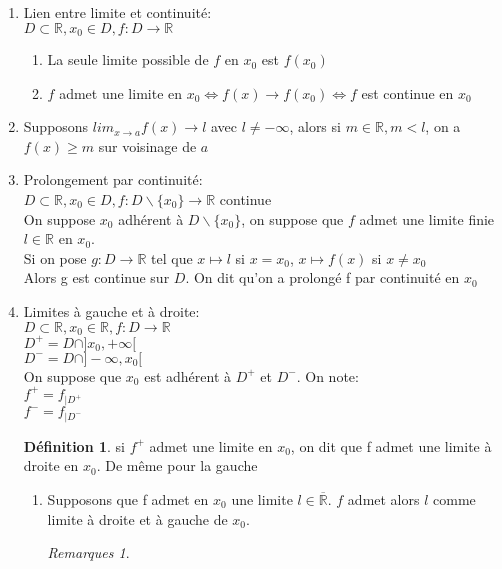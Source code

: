 \documentclass[fleqn]{article}
\theoremstyle{definition} \newtheorem*{defi}{D\'efinition}
\theoremstyle{definition} \newtheorem*{theo}{Th\'eor\`eme}
\theoremstyle{definition} \newtheorem*{adh}{Caract\'erisation s\'equentielle de l'adh\'erence}
\theoremstyle{remark} \newtheorem*{rqs}{Remarques}
\begin{document}
\begin{enumerate}
	\item Lien entre limite et continuit\'e: \\
		$D \subset \mathbb{R}, x_0 \in D, f:D \rightarrow \mathbb{R}$
		\begin{enumerate}
			\item La seule limite possible de $f$ en $x_0$ est $f(x_0)$
			\item $f$ admet une limite en $x_0 \Leftrightarrow f(x) \rightarrow f(x_0) \Leftrightarrow f$ est continue en $x_0$
		\end{enumerate}
	\item Supposons $lim_{x \to a} f(x) \rightarrow l$ avec $l \neq -\infty$, alors si $m \in \mathbb{R}, m < l$, on a $f(x) \geq m$
		sur voisinage de $a$
	\item Prolongement par continuit\'e: \\
		$D \subset \mathbb{R}, x_0 \in D, f:D \backslash \{x_0\} \rightarrow \mathbb{R}$ continue \\
		On suppose $x_0$ adh\'erent \`a $D \backslash \{x_0\}$, on suppose que $f$ admet une limite finie $l \in \mathbb{R}$ en $x_0$. \\
		Si on pose $g: D \rightarrow \mathbb{R}$ tel que $x \mapsto l$ si $x = x_0$, $x \mapsto f(x)$ si $x \neq x_0$ \\
		Alors g est continue sur $D$. On dit qu'on a prolong\'e f par continuit\'e en $x_0$
	\item Limites \`a gauche et \`a droite: \\
		$D \subset \mathbb{R}, x_0 \in \mathbb{R}, f:D \rightarrow \mathbb{R}$ \\
		$D^+ = D \cap ]x_0, +\infty[$ \\
		$D^- = D \cap ]-\infty, x_0[$ \\
		On suppose que $x_0$ est adh\'erent \`a $D^+$ et $D^-$. On note: \\
		$f^+ = f_{|D^+}$ \\
		$f^- = f_{|D^-}$
		\begin{defi}
			si $f^+$ admet une limite en $x_0$, on dit que f admet une limite \`a droite en $x_0$. De m\^eme pour la gauche
		\end{defi}
		\begin{enumerate}
			\item Supposons que f admet en $x_0$ une limite $l \in \overline{\mathbb{R}}$. $f$ admet alors $l$ comme limite \`a droite
				et \`a gauche de $x_0$.
				\begin{rqs}

\end{rqs}
\end{enumerate}
\end{enumerate}
\end{document}
